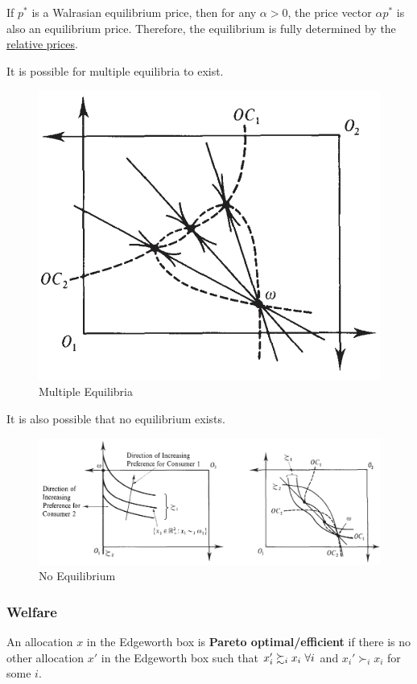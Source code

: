 \documentclass{report}
\begin{document}
		\begin{remark}
			If $p^*$ is a Walrasian equilibrium price, then for any $\alpha > 0$, the price vector $\alpha p^*$ is also an equilibrium price. Therefore, the equilibrium is fully determined by the \ul{relative prices}.
		\end{remark}
		
		\begin{remark}
			It is possible for multiple equilibria to exist.
		\end{remark}
		
		\begin{figure}[h]
			\centering
			\includegraphics[width=0.3\linewidth]{figures/multiple_eq}
			\caption{Multiple Equilibria}
		\end{figure}
		
		\begin{remark}
			It is also possible that no equilibrium exists.
		\end{remark}
		
		\begin{figure}[h]
			\centering
			\includegraphics[width=0.8\linewidth]{figures/none_eq.png}
			\caption{No Equilibrium}
		\end{figure}
		
		\subsubsection{Welfare}
		\begin{definition}[15.B.2]
			An allocation $x$ in the Edgeworth box is \textbf{Pareto optimal/efficient} if there is no other allocation $x'$ in the Edgeworth box such that $x_i' \succsim_i x_i\ \forall i$ and $x_i' \succ_i x_i$ for some $i$.
		\end{definition}
		
\end{document}
